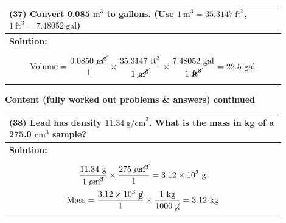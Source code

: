 \documentclass{article}
\begin{document}
\vspace{0.2cm}
\begin{tabular}{|p{0.9\linewidth}|}
\hline
\textbf{(37)} Convert 0.085 $\text{m}^3$ to gallons. (Use $1~\text{m}^3=35.3147~\text{ft}^3$, $1~\text{ft}^3=7.48052~\text{gal}$) \\
\hline
\textbf{Solution:} \\
\[
\text{Volume} = \frac{0.0850~\cancel{\text{m}^3}}{1} \times \frac{35.3147~\text{ft}^3}{1~\cancel{\text{m}^3}} \times \frac{7.48052~\text{gal}}{1~\cancel{\text{ft}^3}} = 22.5~\text{gal}
\]
\\
\hline
\end{tabular}
\newpage
\noindent
{\large \textbf{Content (fully worked out problems \& answers) continued}} \\[0.2em]
\begin{tabular}{|p{0.9\linewidth}|}
\hline
\vspace{0.2cm}

\textbf{(38)} Lead has density $11.34~\text{g/cm}^3$. What is the mass in kg of a 275.0 $\text{cm}^3$ sample? \\
\hline
\textbf{Solution:} \\
\[
\frac{11.34~\text{g}}{1~\cancel{\text{cm}^3}} \times \frac{275~\cancel{\text{cm}^3}}{1} = 3.12 \times 10^3~\text{g}
\]
\[
\text{Mass} = \frac{3.12 \times 10^3~\cancel{\text{g}}}{1} \times \frac{1~\text{kg}}{1000~\cancel{\text{g}}} = 3.12~\text{kg}
\]
\\
\hline
\end{tabular}
\end{document}
